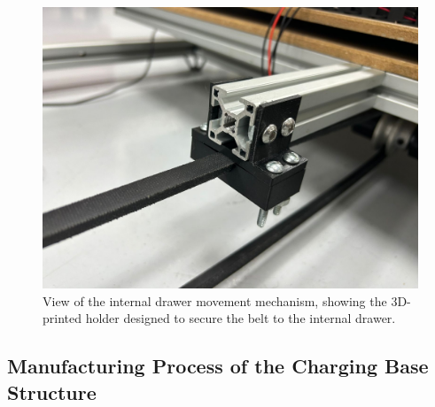 \begin{figure}[H]
\begin{minipage}{0.49\textwidth}
        \label{fig:mecanismo_chumaceras}
    \end{minipage}%
    \hfill
    \begin{minipage}{0.49\textwidth}
        \centering
        \includegraphics[width=\textwidth]{MECANISMO/MECANISMO_AGARRE.jpg}
        \caption{View of the internal drawer movement mechanism, showing the 3D-printed holder designed to secure the belt to the internal drawer.}
        \label{fig:mecanismo_agarre}
    \end{minipage}%
    \hfill
\end{figure}



\subsection{Manufacturing Process of the Charging Base Structure}

